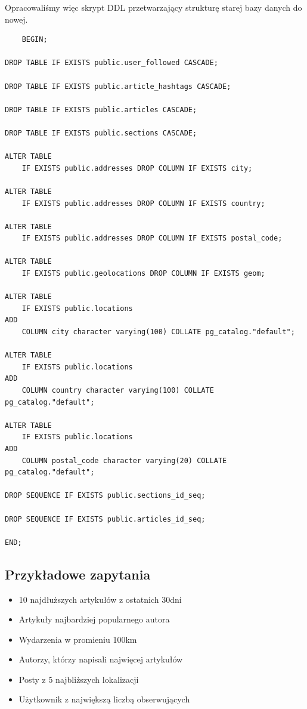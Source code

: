\documentclass{article}
\begin{document}
Opracowaliśmy więc skrypt DDL przetwarzający strukturę starej bazy danych do nowej.

\begin{lstlisting}
    BEGIN;

DROP TABLE IF EXISTS public.user_followed CASCADE;

DROP TABLE IF EXISTS public.article_hashtags CASCADE;

DROP TABLE IF EXISTS public.articles CASCADE;

DROP TABLE IF EXISTS public.sections CASCADE;

ALTER TABLE
    IF EXISTS public.addresses DROP COLUMN IF EXISTS city;

ALTER TABLE
    IF EXISTS public.addresses DROP COLUMN IF EXISTS country;

ALTER TABLE
    IF EXISTS public.addresses DROP COLUMN IF EXISTS postal_code;

ALTER TABLE
    IF EXISTS public.geolocations DROP COLUMN IF EXISTS geom;

ALTER TABLE
    IF EXISTS public.locations
ADD
    COLUMN city character varying(100) COLLATE pg_catalog."default";

ALTER TABLE
    IF EXISTS public.locations
ADD
    COLUMN country character varying(100) COLLATE pg_catalog."default";

ALTER TABLE
    IF EXISTS public.locations
ADD
    COLUMN postal_code character varying(20) COLLATE pg_catalog."default";

DROP SEQUENCE IF EXISTS public.sections_id_seq;

DROP SEQUENCE IF EXISTS public.articles_id_seq;

END;
\end{lstlisting}

\subsection{Przykładowe zapytania}
\begin{itemize}
    \item 10 najdłuższych artykułów z ostatnich 30dni
    \item Artykuły najbardziej popularnego autora
    \item Wydarzenia w promieniu 100km
    \item Autorzy, którzy napisali najwięcej artykułów
    \item Posty z 5 najbliższych lokalizacji
    \item Użytkownik z największą liczbą obserwujących
\end{itemize}
\end{document}
